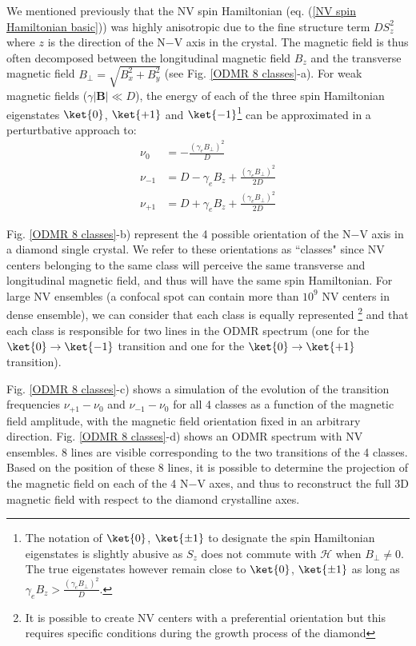 \documentclass[a4paper,11pt]{report}
\begin{document}
We mentioned previously that the NV spin Hamiltonian (eq. (\ref{NV spin Hamiltonian basic})) was highly anisotropic due to the fine structure term $D S_z^2$ where $z$ is the direction of the N$-$V axis in the crystal. The magnetic field is thus often decomposed between the longitudinal magnetic field $B_z$ and the transverse magnetic field $B_\perp=\sqrt{B_x^2+B_y^2}$ (see Fig. \ref{ODMR 8 classes}-a). For weak magnetic fields ($\gamma |\textbf{B}| \ll D$), the energy of each of the three spin Hamiltonian eigenstates $\ket{0}$, $\ket{+1}$ and $\ket{-1}$\footnote{The notation of $\ket{0}$, $\ket{\pm 1}$ to designate the spin Hamiltonian eigenstates is slightly abusive as $S_z$ does not commute with $\mathcal{H}$ when $B_\perp \neq 0$. The true eigenstates however remain close to $\ket{0}$, $\ket{\pm 1}$ as long as $\gamma_e B_z > \frac{(\gamma_e B_\perp)^2}{D}$.} can be approximated in a perturtbative approach to: %
\begin{align}
\nu_0&= -\frac{(\gamma_e B_\perp)^2}{D} \\
\nu_{-1} &= D - \gamma_e B_z + \frac{(\gamma_e B_\perp)^2}{2D} \\
\nu_{+1} &= D + \gamma_e B_z + \frac{(\gamma_e B_\perp)^2}{2D}
\end{align}

Fig. \ref{ODMR 8 classes}-b) represent the 4 possible orientation of the N$-$V axis in a diamond single crystal. We refer to these orientations as ``classes" since NV centers belonging to the same class will perceive the same transverse and longitudinal magnetic field, and thus will have the same spin Hamiltonian. For large NV ensembles (a confocal spot can contain more than $10^9$ NV centers in dense ensemble), we can consider that each class is equally represented \footnote{It is possible to create NV centers with a preferential orientation \citep{lesik2014perfect} but this requires specific conditions during the growth process of the diamond} and that each class is responsible for two lines in the ODMR spectrum (one for the $\ket{0} \to \ket{-1}$ transition and one for the $\ket{0} \to \ket{+1}$ transition). 

Fig. \ref{ODMR 8 classes}-c) shows a simulation of the evolution of the transition frequencies $\nu_{+1} - \nu_{0}$ and $\nu_{-1} - \nu_{0}$ for all 4 classes as a function of the magnetic field amplitude, with the magnetic field orientation fixed in an arbitrary direction. Fig. \ref{ODMR 8 classes}-d) shows an ODMR spectrum with NV ensembles. 8 lines are visible corresponding to the two transitions of the 4 classes. Based on the position of these 8 lines, it is possible to determine the projection of the magnetic field on each of the 4 N$-$V axes, and thus to reconstruct the full 3D magnetic field with respect to the diamond crystalline axes.
\end{document}
